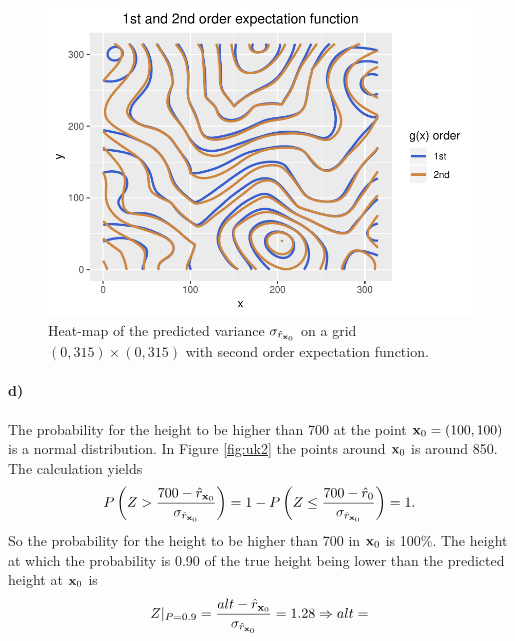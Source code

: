 \begin{figure}[htb]
    \centering
    \includegraphics[scale=0.8,trim=0cm 0cm 0cm 0cm]{figures/uk1n2.pdf}
    \caption{Heat-map of the predicted variance $\sigma_{\hat{r}_{\boldsymbol{\mathbf{x}}_0}}$ on a grid $(0,315)\times(0,315)$ with second order expectation function.}
    \label{fig:uk1n2}
\end{figure}

\paragraph{d)}
The probability for the height to be higher than 700 at the point $\boldsymbol{\mathbf{x}}_0 = (100,100)$ is a normal distribution. In Figure \ref{fig:uk2} the points around $\boldsymbol{\mathbf{x}}_0$ is around 850. The calculation yields 
\begin{equation*}
    P\left(Z>\frac{700 - \hat{r}_{\boldsymbol{\mathbf{x}}_0}}{\sigma_{\hat{r}_{\boldsymbol{\mathbf{x}}_0}}}\right) = 1-P\left(Z\leq\frac{700 - \hat{r}_0}{\sigma_{\hat{r}_{\boldsymbol{\mathbf{x}}_0}}}\right) = 1.
\end{equation*}
So the probability for the height to be higher than 700 in $\boldsymbol{\mathbf{x}}_0$ is 100\%.
The height at which the probability is 0.90 of the true height being lower than the predicted height at $\boldsymbol{\mathbf{x}}_0$ is
\begin{equation*}
    Z|_{P = 0.9} = \frac{alt - \hat{r}_{\boldsymbol{\mathbf{x}}_0}}{\sigma_{\hat{r}_{\boldsymbol{\mathbf{x}}_0}}} = 1.28 \Rightarrow alt = 
\end{equation*}


